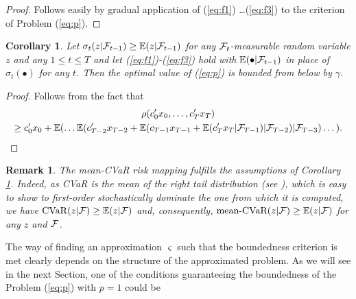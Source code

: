 \documentclass{article}              %
\newtheorem{remark}{Remark}
\newtheorem{corollary}{Corollary}
\begin{document}
\begin{proof} Follows easily by gradual application of (\ref{eq:f1}) \dots (\ref{eq:f3}) to the criterion of Problem (\ref{eq:p}).
\end{proof}

\begin{corollary}\label{cor:feas}
Let $\sigma_{t}(z|\mathcal{F}_{t-1})\geq \mathbb{E}(z|\mathcal{F}_{t-1})$ for any $\mathcal{F}_t$-measurable random variable $z$ and any $1\leq t\leq T$ and 
let (\ref{eq:f1})-(\ref{eq:f3}) hold with $\mathbb{E}(\bullet|\mathcal{F}_{t-1})$ in place of $\sigma_t(\bullet)$ for any $t$. Then the optimal value of (\ref{eq:p}) is bounded from below by $\gamma$.
\end{corollary}

\begin{proof}Follows from the fact that
\begin{multline*}
\rho(c'_{0}x_{0},\dots,c'_{T}x_{T})
\\ 
\geq c'_{0}x_{0}+\mathbb{E}(\dots\mathbb{E}(c'_{T-2}x_{T-2}+\mathbb{E}(c_{T-1}x_{T-1}+\mathbb{E}(c'_{T}x_{T}|\mathcal{F}_{T-1})|\mathcal{F}_{T-2})|\mathcal{F}_{T-3})\dots).
\end{multline*}

\end{proof}


\begin{remark} The mean-CVaR risk mapping fulfills the assumptions of Corollary \ref{cor:feas}. Indeed, as CVaR is the mean of the right tail distribution (see \cite{rockafellar2002conditional}), which is easy
to show to first-order stochastically dominate the one from which
it is computed, we have $\mathrm{CVaR}(z|\mathcal{F}) \geq \mathbb{E}(z|\mathcal{F})$ and, consequently,  $\text{mean-CVaR}(z|\mathcal{F})\geq\mathbb{E}(z|\mathcal{F})$ for any $z$ and $\mathcal{F}$.
\end{remark}

\noindent The way of finding an approximation $\varsigma$ such that the boundedness
criterion is met clearly depends on the structure of the approximated problem.
As we will see in the next Section, one of the conditions guaranteeing
the boundedness of the Problem (\ref{eq:p}) with $p=1$ could be
\end{document}
